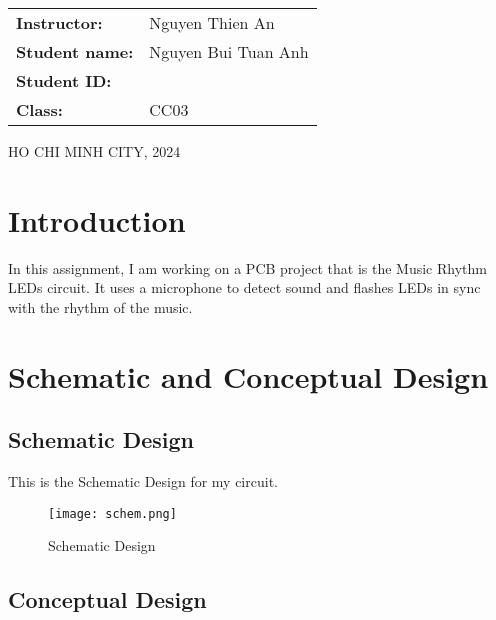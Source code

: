 \documentclass[a4paper]{article}
\numberwithin{figure}{section}
\begin{document}
\begin{titlepage}
\begin{center}
\vspace{1cm}
\begin{table}[H]
    \centering
    \begin{tabular}{l l}
    \textbf{\fontsize{14pt}{0pt}\selectfont Instructor:} & \fontsize{14pt}{0pt}\selectfont Nguyen Thien An \vspace{6pt} \\
    \textbf{\fontsize{14pt}{0pt}\selectfont Student name:} & \fontsize{14pt}{0pt}\selectfont Nguyen Bui Tuan Anh \vspace{6pt} \\ 
    \textbf{\fontsize{14pt}{0pt}\selectfont Student ID:} & \fontsize{14pt}{0pt}\selectfont 2352038 \vspace{6pt} \\
    \textbf{\fontsize{14pt}{0pt}\selectfont Class:} & \fontsize{14pt}{0pt}\selectfont CC03
\end{tabular}
\end{table}
\vspace{3.3cm}
\fontsize{12pt}{0pt}\selectfont HO CHI MINH CITY, 2024
\end{center}
\end{titlepage}

\newpage
\tableofcontents
\newpage

\section{Introduction}
In this assignment, I am working on a PCB project that is the Music Rhythm LEDs circuit. It uses a microphone to detect sound and flashes LEDs in sync with the rhythm of the music.

\section{Schematic and Conceptual Design}
\subsection{Schematic Design}
This is the Schematic Design for my circuit.
\begin{figure}[H]
    \centering
    \texttt{[image: schem.png]}
    \caption{Schematic Design}
\end{figure}
\newpage
\subsection{Conceptual Design}
\end{document}
